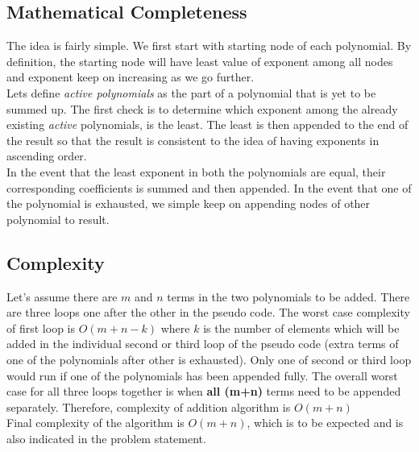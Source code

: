 \subsection{Mathematical Completeness}
The idea is fairly simple. We first start with starting node of each polynomial. By definition, the starting node will have least value of exponent among all nodes and exponent keep on increasing as we go further.\vspace{5pt}
\\
Lets define \textit{active polynomials} as the part of a polynomial that is yet to be summed up. The first check is to determine which exponent among the already existing \textit{active} polynomials, is the least. The least is then appended to the end of the result so that the result is consistent to the idea of having exponents in ascending order. \vspace{5pt}
\\
In the event that the least exponent in both the polynomials are equal, their corresponding coefficients is summed and then appended. In the event that one of the polynomial is exhausted, we simple keep on appending nodes of other polynomial to result.

\subsection{Complexity}
Let's assume there are $m$ and $n$ terms in the two polynomials to be added. There are three loops one after the other in the pseudo code. The worst case complexity of first loop is $O(m+n-k)$ where $k$ is the number of elements which will be added in the individual second or third loop of the pseudo code (extra terms of one of the polynomials after other is exhausted). Only one of second or third loop would run if one of the polynomials has been appended fully. The overall worst case for all three loops together is when \textbf{all (m+n)} terms need to be appended separately. Therefore, complexity of addition algorithm is $O(m+n)$\vspace{5pt}
\\
Final complexity of the algorithm is $O(m+n)$, which is to be expected and is also indicated in the problem statement.